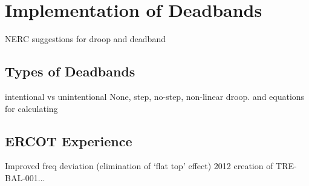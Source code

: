 \section{Implementation of Deadbands}
NERC suggestions for droop and deadband

\subsection{Types of Deadbands}
intentional vs unintentional
None, step, no-step, non-linear droop.
and equations for calculating

\subsection{ERCOT Experience}
Improved freq deviation (elimination of `flat top' effect) 2012 
creation of TRE-BAL-001...